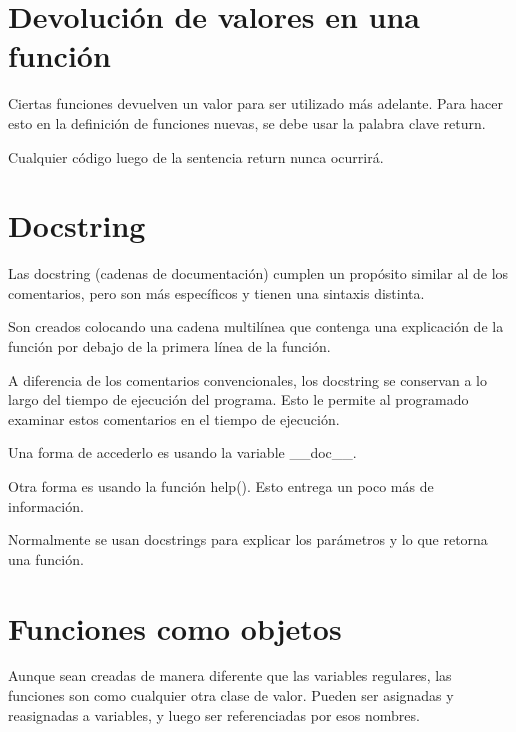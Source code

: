 \documentclass{report}
\begin{document}

\section{Devolución de valores en una función}

Ciertas funciones devuelven un valor para ser utilizado más adelante. Para hacer esto en la definición de funciones nuevas, se debe usar la palabra clave return.


Cualquier código luego de la sentencia return nunca ocurrirá.


\section{Docstring}

Las docstring (cadenas de documentación) cumplen un propósito similar al de los comentarios, pero son más específicos y tienen una sintaxis distinta.

Son creados colocando una cadena multilínea que contenga una explicación de la función por debajo de la primera línea de la función.


A diferencia de los comentarios convencionales, los docstring se conservan a lo largo del tiempo de ejecución del programa. Esto le permite al programado examinar estos comentarios en el tiempo de ejecución.

Una forma de accederlo es usando la variable \_\_doc\_\_.


Otra forma es usando la función help(). Esto entrega un poco más de información.


Normalmente se usan docstrings para explicar los parámetros y lo que retorna una función.


\section{Funciones como objetos}

Aunque sean creadas de manera diferente que las variables regulares, las funciones son como cualquier otra clase de valor. Pueden ser asignadas y reasignadas a variables, y luego ser referenciadas por esos nombres.
\end{document}
